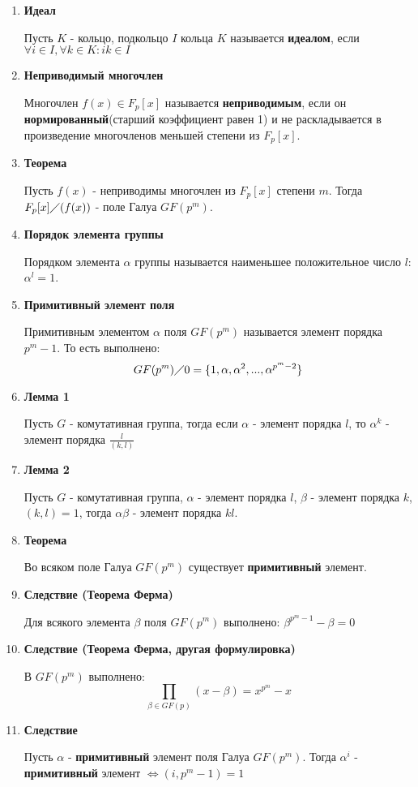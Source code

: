 \documentclass[a4paper, 12pt]{report}
\begin{document}
\begin{enumerate}
 
\item \textbf{Идеал}

Пусть $K$ - кольцо, подкольцо $I$ кольца $K$ называется \textbf{идеалом}, если $\forall i \in I, \forall k \in K:ik \in I$

\item \textbf{Неприводимый многочлен}

Многочлен $f(x)\in F_{p}[x]$ называется \textbf{неприводимым}, если он \textbf{нормированный}(старший коэффициент равен 1) и не раскладывается в произведение многочленов меньшей степени из $F_{p}[x]$.

\item \textbf{Теорема}

Пусть $f(x)$ - неприводимы многочлен из $F_{p}[x]$ степени $m$. Тогда $F_{p}[x]\diagup (f(x))$ - поле Галуа $GF(p^{m})$.

\item \textbf{Порядок элемента группы}

Порядком элемента $\alpha$ группы называется наименьшее положительное число $l$: $\alpha^{l} = 1$.

\item \textbf{Примитивный элемент поля}

Примитивным элементом $\alpha$ поля $GF(p^{m})$ называется элемент порядка $p^{m}-1$. То есть выполнено:
\[GF(p^{m})\diagup 0 = \lbrace 1, \alpha, \alpha^{2}, ..., \alpha^{p^{m}-2} \rbrace \]

\item \textbf{Лемма 1}

Пусть $G$ - комутативная группа, тогда если $\alpha$ - элемент порядка $l$, то $\alpha^{k}$ - элемент порядка $\frac{l}{(k,l)}$

\item \textbf{Лемма 2}

Пусть $G$ - комутативная группа, $\alpha$ - элемент порядка $l$, $\beta$ - элемент порядка $k$, $(k,l) = 1$, тогда $\alpha \beta$ - элемент порядка $kl$.

\item \textbf{Теорема}

Во всяком поле Галуа $GF(p^{m})$ существует \textbf{примитивный} элемент.

\item \textbf{Следствие (Теорема Ферма)}

Для всякого элемента $\beta$ поля $GF(p^{m})$ выполнено: $\beta^{p^{m}-1} - \beta = 0$

\item \textbf{Следствие (Теорема Ферма, другая формулировка)}

В $GF(p^{m})$ выполнено:
\[\prod_{\beta \in GF(p)}(x-\beta) = x^{p^{m}}-x\]

\item \textbf{Следствие}

Пусть $\alpha$ - \textbf{примитивный} элемент поля Галуа $GF(p^{m})$. Тогда $\alpha^{i}$ - \textbf{примитивный} элемент $\Leftrightarrow (i,p^{m}-1) = 1$ 


\end{enumerate}
\end{document}
